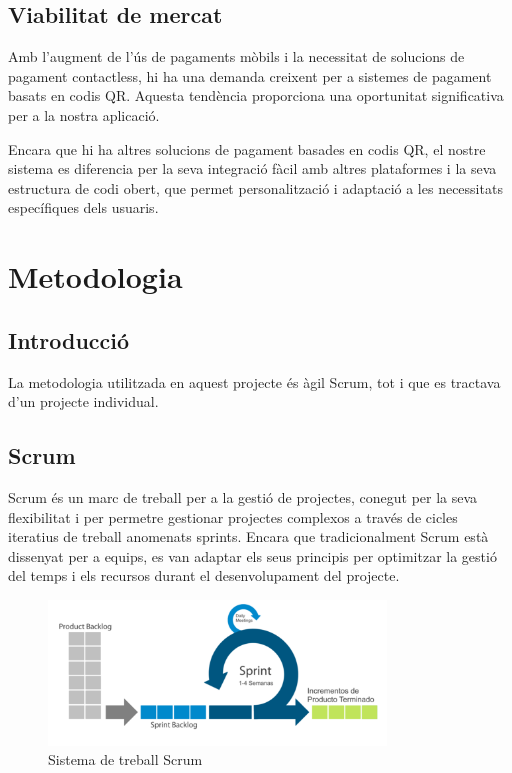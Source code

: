 \documentclass[a4paper,12pt,twoside]{ThesisStyle}
\begin{document}
\section{Viabilitat de mercat}
\label{subsec:Viabilitat de mercat}

Amb l'augment de l'ús de pagaments mòbils i la necessitat de solucions de pagament contactless, hi ha una demanda creixent per a sistemes de pagament basats en codis QR. Aquesta tendència proporciona una oportunitat significativa per a la nostra aplicació.

Encara que hi ha altres solucions de pagament basades en codis QR, el nostre sistema es diferencia per la seva integració fàcil amb altres plataformes i la seva estructura de codi obert, que permet personalització i adaptació a les necessitats específiques dels usuaris.


\chapter{Metodologia}
\label{chp:metodologia}


\section{Introducció}
\label{subsec: Introducció}

La metodologia utilitzada en aquest projecte és àgil Scrum, tot i que es tractava d'un projecte individual. 

\section{Scrum}
\label{subsec: Scrum}

Scrum és un marc de treball per a la gestió de projectes, conegut per la seva flexibilitat i per permetre gestionar projectes complexos a través de cicles iteratius de treball anomenats sprints. Encara que tradicionalment Scrum està dissenyat per a equips, es van adaptar els seus principis per optimitzar la gestió del temps i els recursos durant el desenvolupament del projecte.\\

\begin{figure}[h!] %
  \centering
  \includegraphics[width=0.8\textwidth]{imatges/scrum.png} %
  \caption{Sistema de treball Scrum} %
  \label{fig:exemple} %
\end{figure}
\end{document}
